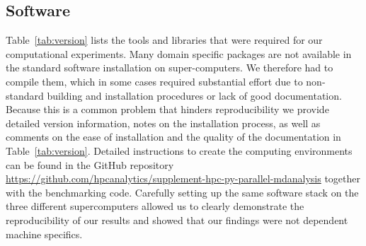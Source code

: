 \subsection{Software}
\label{sec:software}

Table~\ref{tab:version} lists the tools and libraries that were required for our computational experiments.  Many domain specific packages are not available in the standard software installation on super-computers.
We therefore had to compile them, which in some cases required substantial effort due to non-standard building and installation procedures or lack of good documentation.
Because this is a common problem that hinders reproducibility we provide detailed version information, notes on the installation process, as well as comments on the ease of installation and the quality of the documentation in Table~\ref{tab:version}.
Detailed instructions to create the computing environments can be found in the GitHub repository \url{https://github.com/hpcanalytics/supplement-hpc-py-parallel-mdanalysis} together with the benchmarking code.
Carefully setting up the same software stack on the three different supercomputers allowed us to clearly demonstrate the reproducibility of our results and showed that our findings were not dependent machine specifics.



